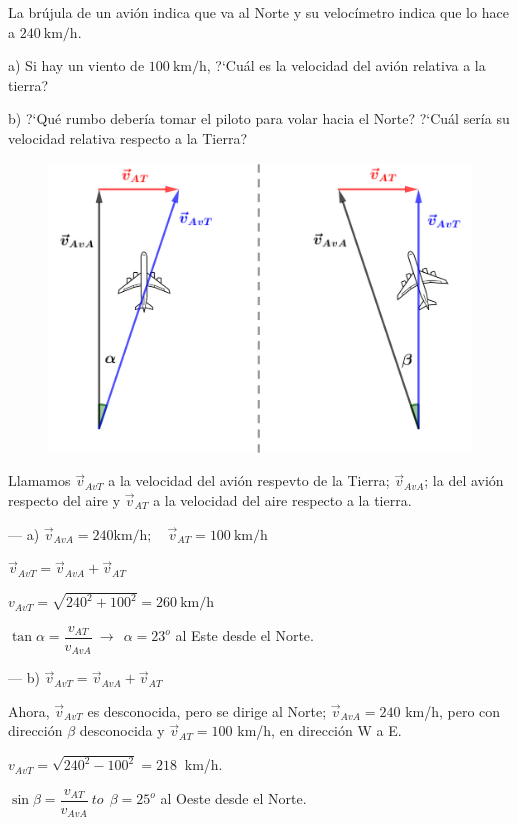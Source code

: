 \begin{prob}
La brújula de un avión indica que va al Norte y su velocímetro indica que lo hace a $240\ \mathrm{km/h}$. 

a) Si hay un viento de $100\ \mathrm{km/h}$, ?`Cuál es la velocidad del avión relativa a la tierra?

b) ?`Qué rumbo debería tomar el piloto para volar hacia el Norte? ?`Cuál sería su velocidad relativa respecto a la Tierra?
\end{prob}
\begin{figure}[H]
	\centering
	\includegraphics[width=.8\textwidth]{imagenes/imagenes10/T10IM09.png}
\end{figure}

Llamamos $\vec v_{AvT}$ a la velocidad del avión respevto de la Tierra; $\vec v_{AvA}$; la del avión respecto del aire y $\vec v_{AT}$ a la velocidad del aire respecto a la tierra.

--- a) $\vec v_{AvA}=240 \text{km/h};\quad \vec v_{AT}=100\ \text{km/h}$

$\vec v_{AvT}=\vec v_{AvA}+\vec v_{AT}$

$v_{AvT}=\sqrt{240^2+100^2}=260\ \text{km/h}$

$\tan \alpha=\dfrac {v_{AT}}{v_{AvA}}\ \to \ \  \alpha = 23^o $ al Este desde el Norte.

--- b) $\vec v_{AvT}=\vec v_{AvA}+\vec v_{AT}$

Ahora, $\vec v_{AvT}$ es desconocida, pero se dirige al Norte; $\vec v_{AvA}=240$ km/h, pero con dirección $\beta$ desconocida  y $\vec v_{AT}=100$ km/h, en dirección W a E.

$v_{AvT}= \sqrt{240^2-100^2}=218\ $ km/h.

$\sin \beta=\dfrac{v_{AT}}{v_{AvA}}\ to \ \ \beta=25^o$ al Oeste desde el Norte.



